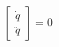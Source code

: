 \documentclass[preview]{standalone}
\begin{document}
\begin{align*}
\begin{bmatrix}\dot{q} \\ \ddot{q}\end{bmatrix} = 0
\end{align*}
\end{document}

